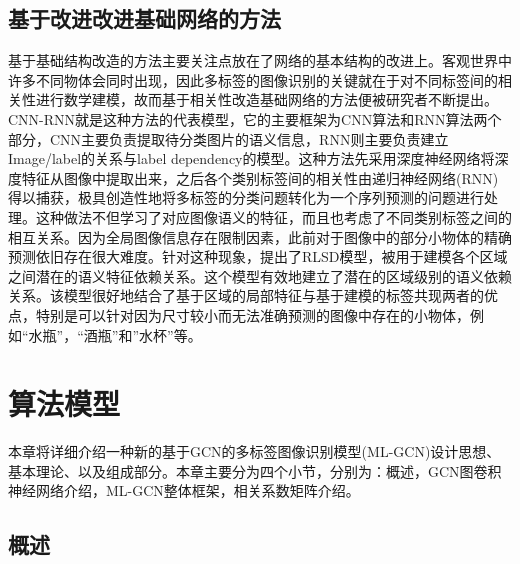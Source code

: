 \subsection{基于改进改进基础网络的方法}

基于基础结构改造的方法主要关注点放在了网络的基本结构的改进上。客观世界中许多不同物体会同时出现，因此多标签的图像识别的关键就在于对不同标签间的相关性进行数学建模，故而基于相关性改造基础网络的方法便被研究者不断提出。CNN-RNN就是这种方法的代表模型，它的主要框架为CNN算法和RNN算法两个部分，CNN主要负责提取待分类图片的语义信息，RNN则主要负责建立Image/label的关系与label dependency的模型。这种方法先采用深度神经网络将深度特征从图像中提取出来，之后各个类别标签间的相关性由递归神经网络(RNN)得以捕获，极具创造性地将多标签的分类问题转化为一个序列预测的问题进行处理。这种做法不但学习了对应图像语义的特征，而且也考虑了不同类别标签之间的相互关系。因为全局图像信息存在限制因素，此前对于图像中的部分小物体的精确预测依旧存在很大难度。针对这种现象，提出了RLSD模型，被用于建模各个区域之间潜在的语义特征依赖关系。这个模型有效地建立了潜在的区域级别的语义依赖关系。该模型很好地结合了基于区域的局部特征与基于建模的标签共现两者的优点，特别是可以针对因为尺寸较小而无法准确预测的图像中存在的小物体，例如“水瓶”，“酒瓶”和”水杯”等。

\section{算法模型}

本章将详细介绍一种新的基于GCN的多标签图像识别模型(ML-GCN)设计思想、基本理论、以及组成部分。本章主要分为四个小节，分别为：概述，GCN图卷积神经网络介绍，ML-GCN整体框架，相关系数矩阵介绍。

\subsection{概述}

